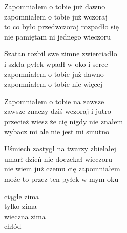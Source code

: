 \begin{text}
    Zapomniałem o tobie już dawno\\
    zapomniałem o tobie już wczoraj\\
    to co było przedwczoraj rozpadło się\\
    nie pamiętam ni jednego wieczoru

    Szatan rozbił swe zimne zwierciadło\\
    i szkła pyłek wpadł w oko i serce\\
    zapomniałem o tobie już dawno\\
    zapomniałem o tobie nic więcej

    Zapomniałem o tobie na zawsze\\
    zawsze znaczy dziś wczoraj i jutro\\
    przecież wiesz że cię nigdy nie znałem\\
    wybacz mi ale nie jest mi smutno

    Uśmiech zastygł na twarzy zbielałej\\
    umarł dzień nie doczekał wieczoru\\
    nie wiem już czemu cię zapomniałem\\
    może to przez ten pyłek w mym oku

    ciągle zima\\
    tylko zima\\
    wieczna zima\\
    chłód
\end{text}
\begin{chord}

\end{chord}